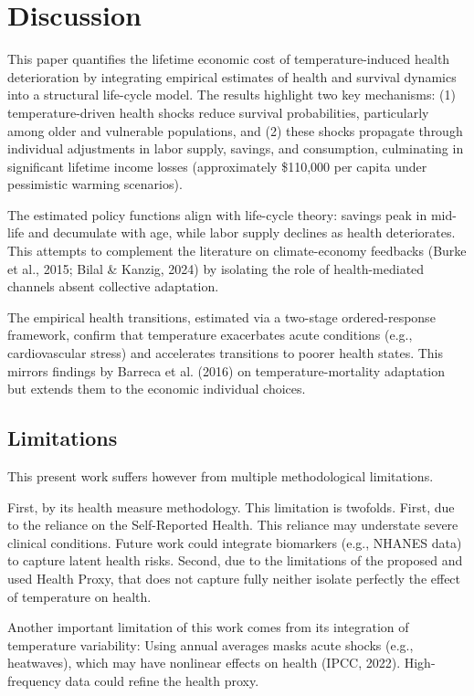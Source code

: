 \documentclass{article}
\begin{document}
\section{Discussion}

This paper quantifies the lifetime economic cost of temperature-induced health deterioration by integrating empirical estimates of health and survival dynamics into a structural life-cycle model. The results highlight two key mechanisms: (1) temperature-driven health shocks reduce survival probabilities, particularly among older and vulnerable populations, and (2) these shocks propagate through individual adjustments in labor supply, savings, and consumption, culminating in significant lifetime income losses (approximately \$110,000 per capita under pessimistic warming scenarios).

The estimated policy functions align with life-cycle theory: savings peak in mid-life and decumulate with age, while labor supply declines as health deteriorates.
This attempts to complement the literature on climate-economy feedbacks (Burke et al., 2015; Bilal \& Kanzig, 2024) by isolating the role of health-mediated channels absent collective adaptation.

The empirical health transitions, estimated via a two-stage ordered-response framework, confirm that temperature exacerbates acute conditions (e.g., cardiovascular stress) and accelerates transitions to poorer health states.
This mirrors findings by Barreca et al. (2016) on temperature-mortality adaptation but extends them to the economic individual choices.

\subsection{Limitations}

This present work suffers however from multiple methodological limitations.

First, by its health measure methodology. 
This limitation is twofolds. 
First, due to the reliance on the Self-Reported Health.
This reliance may understate severe clinical conditions.
Future work could integrate biomarkers (e.g., NHANES data) to capture latent health risks.
Second, due to the limitations of the proposed and used Health Proxy,
that does not capture fully neither isolate perfectly the effect of temperature on health.

Another important limitation of this work comes from its integration of temperature variability:
Using annual averages masks acute shocks (e.g., heatwaves), which may have nonlinear effects on health (IPCC, 2022).
High-frequency data could refine the health proxy.
\end{document}
